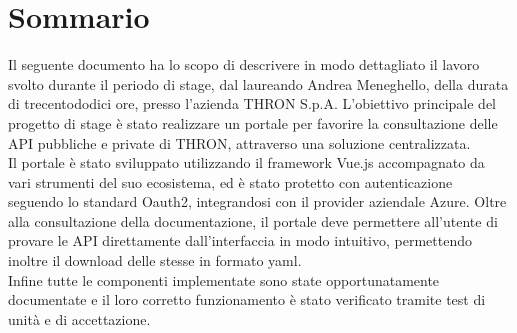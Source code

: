 \cleardoublepage
{}
{}
\begingroup
\let\clearpage\relax
\let\cleardoublepage\relax
\let\cleardoublepage\relax

\chapter*{Sommario}

Il seguente documento ha lo scopo di descrivere in modo dettagliato il lavoro svolto durante il periodo di stage, dal laureando Andrea Meneghello, della durata di trecentododici ore, presso l'azienda THRON S.p.A.
L'obiettivo principale del progetto di stage è stato realizzare un portale per favorire la consultazione delle API pubbliche e private di THRON, attraverso una soluzione centralizzata.\\
Il portale è stato sviluppato utilizzando il framework Vue.js accompagnato da vari strumenti del suo ecosistema, ed è stato protetto con autenticazione seguendo lo standard Oauth2, integrandosi con il provider aziendale Azure.
Oltre alla consultazione della documentazione, il portale deve permettere all'utente di provare le API direttamente dall'interfaccia in modo intuitivo, permettendo inoltre il download delle stesse in formato yaml.\\
Infine tutte le componenti implementate sono state opportunatamente documentate e il loro corretto funzionamento è stato verificato tramite test di unità e di accettazione.




\endgroup

\vfill
